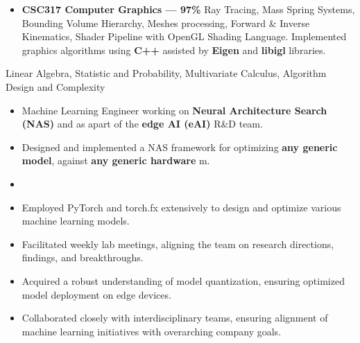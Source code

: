 \documentclass[10pt,a4paper,ragged2e,withhyper]{altacv}
\begin{document}
\begin{paracol}{2}
\begin{itemize}
    \item  \textbf{CSC317 Computer Graphics --- 97\%}
    Ray Tracing, Mass Spring Systems, Bounding Volume Hierarchy, Meshes processing, Forward \& Inverse Kinematics, Shader Pipeline with OpenGL Shading Language. Implemented graphics algorithms using \textbf{C++} assisted by \textbf{Eigen} and 
    \textbf{libigl} libraries. 

\end{itemize}
\vspace{-5pt}
\vspace{-5pt}
Linear Algebra, Statistic and Probability, Multivariate Calculus, Algorithm Design and Complexity

 

\begin{itemize}
    \item Machine Learning Engineer working on \textbf{Neural Architecture Search (NAS)} and as apart of the \textbf{edge AI (eAI)} R\&D team.

    \item Designed and implemented a NAS framework for optimizing \textbf{any generic model}, against \textbf{any generic hardware} m.
        
    \item  

    \item Employed PyTorch and torch.fx extensively to design and optimize various machine learning models.

    \item Facilitated weekly lab meetings, aligning the team on research directions, findings, and breakthroughs.

    \item Acquired a robust understanding of model quantization, ensuring optimized model deployment on edge devices.

    \item Collaborated closely with interdisciplinary teams, ensuring alignment of machine learning initiatives with overarching company goals.


\end{itemize}
\end{paracol}
\end{document}
